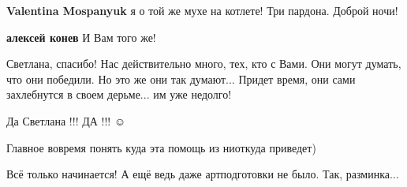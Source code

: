 \begin{itemize}
\begin{itemize}
 
\textbf{Valentina Mospanyuk} я о той же мухе на котлете! Три пардона. Доброй ночи!

 
\textbf{алексей конев} И Вам того же!

\end{itemize}

 
Светлана, спасибо! Нас действительно много, тех, кто с Вами. Они могут думать, что они победили. Но это же они так думают... Придет время, они сами захлебнутся в своем дерьме... им уже недолго!

 
Да Светлана !!! ДА !!! ☺

 
Главное вовремя понять куда эта помощь из ниоткуда приведет)

 
Всё только начинается!
А ещё ведь даже артподготовки не было.
Так, разминка...


\end{itemize}
